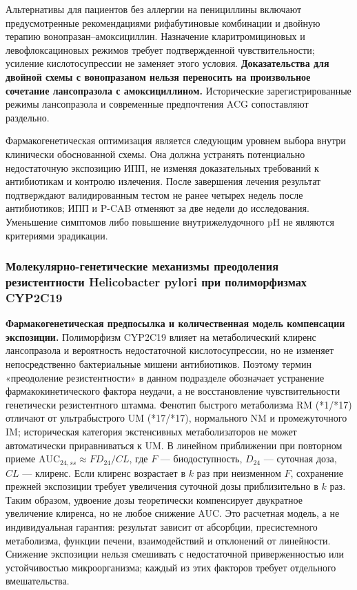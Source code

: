 \documentclass[11pt,a4paper,notitlepage]{report}
\newcommand{\src}[1]{\unskip\space\cite{#1}}
\begin{document}
Альтернативы для пациентов без аллергии на пенициллины включают предусмотренные рекомендациями рифабутиновые комбинации и двойную терапию вонопразан--амоксициллин. Назначение кларитромициновых и левофлоксациновых режимов требует подтвержденной чувствительности; усиление кислотосупрессии не заменяет этого условия. \textbf{Доказательства для двойной схемы с вонопразаном нельзя переносить на произвольное сочетание лансопразола с амоксициллином.} Исторические зарегистрированные режимы лансопразола и современные предпочтения ACG сопоставляют раздельно.\src{acghp,uslabel}

Фармакогенетическая оптимизация является следующим уровнем выбора внутри клинически обоснованной схемы. Она должна устранять потенциально недостаточную экспозицию ИПП, не изменяя доказательных требований к антибиотикам и контролю излечения. После завершения лечения результат подтверждают валидированным тестом не ранее четырех недель после антибиотиков; ИПП и P-CAB отменяют за две недели до исследования. Уменьшение симптомов либо повышение внутрижелудочного pH не являются критериями эрадикации.\src{acghp}

\subsubsection{Молекулярно-генетические механизмы преодоления резистентности Helicobacter pylori при полиморфизмах CYP2C19}
\label{sec:hp-exposure-resistance}

\textbf{Фармакогенетическая предпосылка и количественная модель компенсации экспозиции.} Полиморфизм CYP2C19 влияет на метаболический клиренс лансопразола и вероятность недостаточной кислотосупрессии, но не изменяет непосредственно бактериальные мишени антибиотиков. Поэтому термин «преодоление резистентности» в данном подразделе обозначает устранение фармакокинетического фактора неудачи, а не восстановление чувствительности генетически резистентного штамма. Фенотип быстрого метаболизма RM (*1/*17) отличают от ультрабыстрого UM (*17/*17), нормального NM и промежуточного IM; историческая категория экстенсивных метаболизаторов не может автоматически приравниваться к UM.\src{cpic,acghp} В линейном приближении при повторном приеме $\mathrm{AUC}_{24,ss}\approx F D_{24}/CL$, где $F$ --- биодоступность, $D_{24}$ --- суточная доза, $CL$ --- клиренс. Если клиренс возрастает в $k$ раз при неизменном $F$, сохранение прежней экспозиции требует увеличения суточной дозы приблизительно в $k$ раз. Таким образом, удвоение дозы теоретически компенсирует двукратное увеличение клиренса, но не любое снижение AUC. Это расчетная модель, а не индивидуальная гарантия: результат зависит от абсорбции, пресистемного метаболизма, функции печени, взаимодействий и отклонений от линейности.\src{molp450,uslabel} Снижение экспозиции нельзя смешивать с недостаточной приверженностью или устойчивостью микроорганизма; каждый из этих факторов требует отдельного вмешательства.\src{acghp,cpic}
\end{document}
